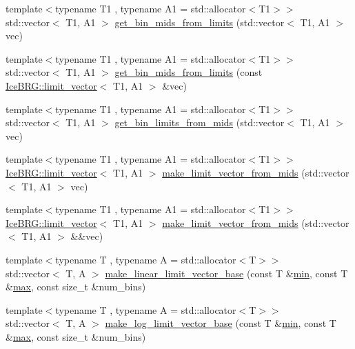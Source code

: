 \begin{DoxyCompactItemize}
\item 
{\footnotesize template$<$typename T1 , typename A1  = std\-::allocator$<$\-T1$>$$>$ }\\std\-::vector$<$ T1, A1 $>$ \hyperlink{namespaceIceBRG_a25cbd77d4d61fa7f65b76d8778b906df}{get\-\_\-bin\-\_\-mids\-\_\-from\-\_\-limits} (std\-::vector$<$ T1, A1 $>$ vec)
\item 
{\footnotesize template$<$typename T1 , typename A1  = std\-::allocator$<$\-T1$>$$>$ }\\std\-::vector$<$ T1, A1 $>$ \hyperlink{namespaceIceBRG_a5297d4484fe448a720bb3e02a4ad03a8}{get\-\_\-bin\-\_\-mids\-\_\-from\-\_\-limits} (const \hyperlink{classIceBRG_1_1limit__vector}{Ice\-B\-R\-G\-::limit\-\_\-vector}$<$ T1, A1 $>$ \&vec)
\item 
{\footnotesize template$<$typename T1 , typename A1  = std\-::allocator$<$\-T1$>$$>$ }\\std\-::vector$<$ T1, A1 $>$ \hyperlink{namespaceIceBRG_aa1e0478e05928e5b62f51b5df35ca7ca}{get\-\_\-bin\-\_\-limits\-\_\-from\-\_\-mids} (std\-::vector$<$ T1, A1 $>$ vec)
\item 
{\footnotesize template$<$typename T1 , typename A1  = std\-::allocator$<$\-T1$>$$>$ }\\\hyperlink{classIceBRG_1_1limit__vector}{Ice\-B\-R\-G\-::limit\-\_\-vector}$<$ T1, A1 $>$ \hyperlink{namespaceIceBRG_a89f92f8b74eb89c0aea4e36cc30e1b4c}{make\-\_\-limit\-\_\-vector\-\_\-from\-\_\-mids} (std\-::vector$<$ T1, A1 $>$ vec)
\item 
{\footnotesize template$<$typename T1 , typename A1  = std\-::allocator$<$\-T1$>$$>$ }\\\hyperlink{classIceBRG_1_1limit__vector}{Ice\-B\-R\-G\-::limit\-\_\-vector}$<$ T1, A1 $>$ \hyperlink{namespaceIceBRG_a2024da38ca764c4ddcb6945d528b7d26}{make\-\_\-limit\-\_\-vector\-\_\-from\-\_\-mids} (std\-::vector$<$ T1, A1 $>$ \&\&vec)
\item 
{\footnotesize template$<$typename T , typename A  = std\-::allocator$<$\-T$>$$>$ }\\std\-::vector$<$ T, A $>$ \hyperlink{namespaceIceBRG_a264c30f1b296ff478c4bb8a7a0f09eac}{make\-\_\-linear\-\_\-limit\-\_\-vector\-\_\-base} (const T \&\hyperlink{namespaceIceBRG_ad79c6bf9877e0d543cf61a479754e4b6}{min}, const T \&\hyperlink{namespaceIceBRG_a095a1ee68bf6116d22d2e23a2b8bfb9d}{max}, const size\-\_\-t \&num\-\_\-bins)
\item 
{\footnotesize template$<$typename T , typename A  = std\-::allocator$<$\-T$>$$>$ }\\std\-::vector$<$ T, A $>$ \hyperlink{namespaceIceBRG_a5374d4453275e8d42e85890f9076de67}{make\-\_\-log\-\_\-limit\-\_\-vector\-\_\-base} (const T \&\hyperlink{namespaceIceBRG_ad79c6bf9877e0d543cf61a479754e4b6}{min}, const T \&\hyperlink{namespaceIceBRG_a095a1ee68bf6116d22d2e23a2b8bfb9d}{max}, const size\-\_\-t \&num\-\_\-bins)

\end{DoxyCompactItemize}
